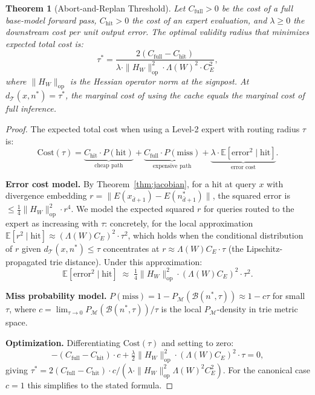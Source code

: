 \documentclass[10pt,a4paper]{amsart}
\newtheorem{theorem}{Theorem}
\begin{document}
\begin{theorem}[Abort-and-Replan Threshold]
\label{thm:abort}
Let $C_{\mathrm{full}} > 0$ be the cost of a full base-model forward pass,
$C_{\mathrm{hit}} > 0$ the cost of an expert evaluation, and $\lambda \geq 0$
the downstream cost per unit output error.  The optimal validity radius that
minimizes expected total cost is:
\[
  \tau^* = \frac{2(C_{\mathrm{full}} - C_{\mathrm{hit}})}{\lambda \cdot
  \|H_W\|_{\mathrm{op}}^2 \cdot \Lambda(W)^2 \cdot C_E^2},
\]
where $\|H_W\|_{\mathrm{op}}$ is the Hessian operator norm at the signpost.
At $d_{\mathcal{T}}(x, n^*) = \tau^*$, the marginal cost of using the cache
equals the marginal cost of full inference.
\end{theorem}

\begin{proof}
The expected total cost when using a Level-2 expert with routing radius $\tau$ is:
\[
  \mathrm{Cost}(\tau) = \underbrace{C_{\mathrm{hit}} \cdot P(\text{hit})}_{
    \text{cheap path}} +
  \underbrace{C_{\mathrm{full}} \cdot P(\text{miss})}_{
    \text{expensive path}} +
  \underbrace{\lambda \cdot \mathbb{E}[\text{error}^2 \mid \text{hit}]}_{
    \text{error cost}}.
\]

\textbf{Error cost model.}  By Theorem~\ref{thm:jacobian}, for a hit at query $x$
with divergence embedding $r = \|E(x_{\bar{d}+1}) - E(n^*_{\bar{d}+1})\|$,
the squared error is $\leq \frac{1}{4}\|H_W\|_{\mathrm{op}}^2 \cdot r^4$.
We model the expected squared $r$ for queries routed to the expert as increasing
with $\tau$: concretely, for the local approximation $\mathbb{E}[r^2 \mid
\text{hit}] \approx (\Lambda(W) C_E)^2 \cdot \tau^2$, which holds when the
conditional distribution of $r$ given $d_{\mathcal{T}}(x, n^*) \leq \tau$
concentrates at $r \approx \Lambda(W) C_E \cdot \tau$ (the Lipschitz-propagated
trie distance).  Under this approximation:
\[
  \mathbb{E}[\text{error}^2 \mid \text{hit}]
  \;\approx\; \tfrac{1}{4}\|H_W\|_{\mathrm{op}}^2 \cdot (\Lambda(W) C_E)^2 \cdot \tau^2.
\]

\textbf{Miss probability model.}  $P(\text{miss}) = 1 - P_{\mathcal{M}}(\mathcal{B}(n^*, \tau))
\approx 1 - c\tau$ for small $\tau$, where $c = \lim_{\tau\to 0}
P_{\mathcal{M}}(\mathcal{B}(n^*, \tau))/\tau$ is the local $P_{\mathcal{M}}$-density
in trie metric space.

\textbf{Optimization.}  Differentiating $\mathrm{Cost}(\tau)$ and setting to zero:
\[
  -(C_{\mathrm{full}} - C_{\mathrm{hit}}) \cdot c
  + \tfrac{\lambda}{2}\|H_W\|_{\mathrm{op}}^2 \cdot (\Lambda(W) C_E)^2 \cdot \tau
  = 0,
\]
giving $\tau^* = 2(C_{\mathrm{full}} - C_{\mathrm{hit}}) \cdot c /
(\lambda \cdot \|H_W\|_{\mathrm{op}}^2 \Lambda(W)^2 C_E^2)$.  For the
canonical case $c = 1$ this simplifies to the stated formula.
\end{proof}
\end{document}
